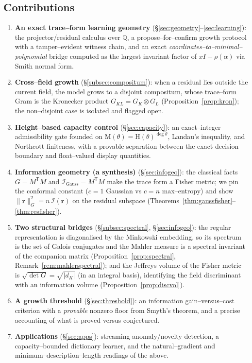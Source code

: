 \documentclass[11pt]{article}
\theoremstyle{plain}
\theoremstyle{definition}
\theoremstyle{remark}
\newcommand{\Q}{\mathbb{Q}}
\newcommand{\K}{K}
\newcommand{\Mah}{\mathrm{M}}
\newcommand{\height}{\mathrm{H}}
\newcommand{\Fish}{\mathcal{I}}
\newcommand{\rr}{\mathbf{r}}
\newcommand{\GG}{G}
\newcommand{\transpose}{^{\mathsf{T}}}
\begin{document}
\subsection*{Contributions}
\begin{enumerate}[label=(C\arabic*),leftmargin=*]
  \item \textbf{An exact trace--form learning geometry} (\S\ref{sec:geometry}--\ref{sec:learning}): the
        projector/residual calculus over $\Q$, a propose--for--confirm growth protocol with a tamper--evident
        witness chain, and an exact \emph{coordinates--to--minimal--polynomial} bridge computed as the
        largest invariant factor of $xI-\rho(\alpha)$ via Smith normal form.
  \item \textbf{Cross--field growth} (\S\ref{subsec:compositum}): when a residual lies outside the current
        field, the model grows to a disjoint compositum, whose trace--form Gram is the Kronecker product
        $\GG_{\K\!L}=\GG_\K\otimes\GG_L$ (Proposition~\ref{prop:kron}); the non--disjoint case is isolated and
        flagged open.
  \item \textbf{Height--based capacity control} (\S\ref{sec:capacity}): an exact--integer admissibility gate
        founded on $\Mah(\theta)=\height(\theta)^{\deg\theta}$, Landau's inequality, and Northcott finiteness,
        with a provable separation between the exact decision boundary and float--valued display quantities.
  \item \textbf{Information geometry (a synthesis)} (\S\ref{sec:infogeo}): the classical facts
        $\GG=M\transpose M$ and $\Fish_{\mathrm{Gauss}}=M\transpose M$ make the trace form a Fisher metric; we
        pin the conformal constant ($c=1$ Gaussian vs $c=n$ max--entropy) and show
        $\lVert\rr\rVert_{\GG}^2=n\,\Fish(\rr)$ on the residual subspace
        (Theorems~\ref{thm:gaussfisher}--\ref{thm:resfisher}).
  \item \textbf{Two structural bridges} (\S\ref{subsec:spectral}, \S\ref{sec:infogeo}): the regular
        representation is diagonalised by the Minkowski embedding, so its spectrum is the set of Galois
        conjugates and the Mahler measure is a spectral invariant of the companion matrix
        (Proposition~\ref{prop:spectral}, Remark~\ref{rem:mahlerspectral}); and the Jeffreys volume of the
        Fisher metric is $\sqrt{\det\GG}=\sqrt{|d_\K|}$ (in an integral basis), identifying the field
        discriminant with an information volume (Proposition~\ref{prop:discvol}).
  \item \textbf{A growth threshold} (\S\ref{sec:threshold}): an information gain--versus--cost criterion
        with a \emph{provable} nonzero floor from Smyth's theorem, and a precise accounting of what is proved
        versus conjectured.
  \item \textbf{Applications} (\S\ref{sec:apps}): streaming anomaly/novelty detection, a capacity--bounded
        dictionary learner, and the natural--gradient and minimum--description--length readings of the above.
\end{enumerate}
\end{document}
